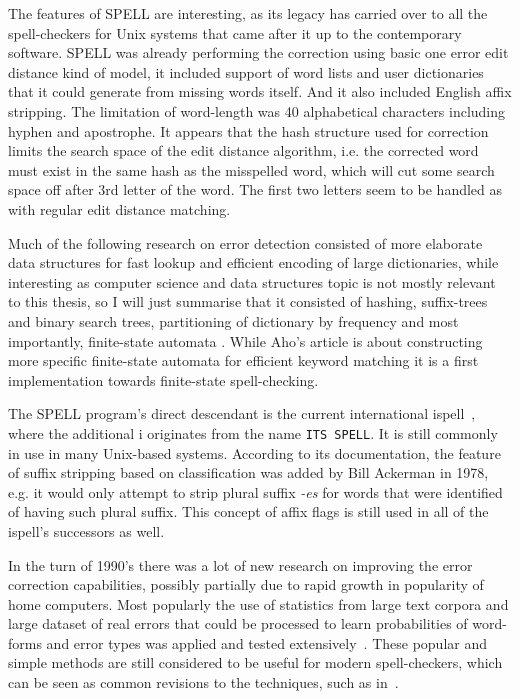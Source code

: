 \documentclass[officiallayout,draft]{unihelcompling}
\begin{document}
The features of SPELL are interesting, as its legacy has carried over to all
the spell-checkers for Unix systems that came after it up to the contemporary
software.  SPELL was already performing the correction using basic one error
edit distance kind of model, it included support of word lists and user
dictionaries that it could generate from missing words itself. And it also
included English affix
stripping. The limitation of word-length was 40 alphabetical characters
including hyphen and apostrophe. It appears that the hash structure used for
correction limits the search space of the edit distance algorithm, i.e. the
corrected word must exist in the same hash as the misspelled word, which will
cut some search space off after 3rd letter of the word. The first two letters
seem to be handled as with regular edit distance matching.
\citep{gorin1971spell}

Much of the following research on error detection consisted of more elaborate
data structures for fast lookup and efficient encoding of large dictionaries,
while interesting as computer science and data structures topic is not mostly
relevant to this thesis, so I will just summarise that it consisted of hashing,
suffix-trees and binary search trees, partitioning of dictionary by frequency
\citep{knuth1973art} and most importantly, finite-state automata
\citep{aho1975efficient}. While Aho's article is about constructing more
specific finite-state automata for efficient keyword matching it is a first
implementation towards finite-state spell-checking.

The SPELL program's direct descendant is the current international
ispell~\citep{gorin1971spell}, where the additional i originates from the name
\texttt{ITS SPELL}. It is still commonly in use in many Unix-based systems.
According to its documentation, the feature of suffix stripping based on
classification was added by Bill Ackerman in 1978, e.g. it would only attempt
to strip plural suffix \emph{-es} for words that were identified of having such
plural suffix.  This concept of affix flags is still used in all of the
ispell's successors as well.

In the turn of 1990's there was a lot of new research on improving the error
correction capabilities, possibly partially due to rapid growth in popularity
of home computers. Most popularly the use of statistics from large text corpora
and large dataset of real errors that could be processed to learn probabilities
of word-forms and error types was applied and tested
extensively~\citep{kernighan1990spelling,church1991probability}. These popular
and simple methods are still considered to be useful for modern spell-checkers,
which can be seen as common revisions to the techniques, such as
in~\citet{brill2000improved}.
\end{document}
